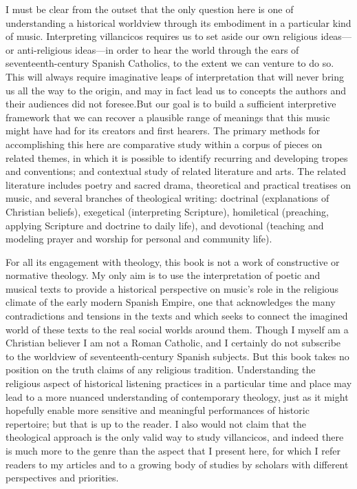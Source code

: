 I must be clear from the outset that the only question here is one of
understanding a historical worldview through its embodiment in a particular
kind of music.
Interpreting villancicos requires us to set aside our own religious ideas---or
anti-religious ideas---in order to hear the world through the ears of
seventeenth-century Spanish Catholics, to the extent we can venture to do so.
This will always require imaginative leaps of interpretation that will never
bring us all the way to the origin, and may in fact lead us to concepts the
authors and their audiences did not foresee.
But our goal is to build a sufficient interpretive framework that we can
recover a plausible range of meanings that this music might have had for its
creators and first hearers.
The primary methods for accomplishing this here are comparative study within a
corpus of pieces on related themes, in which it is possible to identify
recurring and developing tropes and conventions; and contextual study of
related literature and arts.
The related literature includes poetry and sacred drama, theoretical and
practical treatises on music, and several branches of theological writing:
doctrinal (explanations of Christian beliefs), exegetical (interpreting
Scripture), homiletical (preaching, applying Scripture and doctrine to daily
life), and devotional (teaching and modeling prayer and worship for personal
and community life).

For all its engagement with theology, this book is not a work of constructive
or normative theology. 
My only aim is to use the interpretation of poetic and musical texts to provide
a historical perspective on music's role in the religious climate of the early
modern Spanish Empire, one that acknowledges the many contradictions and
tensions in the texts and which seeks to connect the imagined world of these
texts to the real social worlds around them. 
Though I myself am a Christian believer I am not a Roman Catholic, and I
certainly do not subscribe to the worldview of seventeenth-century Spanish
subjects.
But this book takes no position on the truth claims of any religious tradition.
Understanding the religious aspect of historical listening practices in a
particular time and place may lead to a more nuanced understanding of
contemporary theology, just as it might hopefully enable more sensitive and
meaningful performances of historic repertoire; but that is up to the reader.
I also would not claim that the theological approach is the only valid way to
study villancicos, and indeed there is much more to the genre than the aspect
that I present here, for which I refer readers to my articles and to a growing
body of studies by scholars with different perspectives and priorities.

